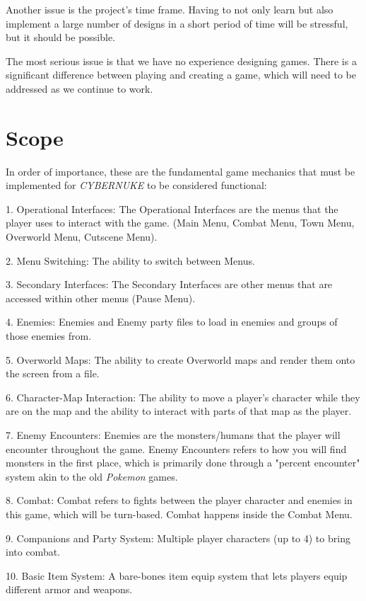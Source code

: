 \documentclass[10pt,conference,onecolumn,compsoc]{IEEEtran}
\begin{document}
Another issue is the project's time frame. Having to not only learn but also implement a large number of designs in a short period of time will be stressful, but it should be possible.

The most serious issue is that we have no experience designing games. There is a significant difference between playing and creating a game, which will need to be addressed as we continue to work. 

\pagebreak
\section{Scope}
In order of importance, these are the fundamental game mechanics that must be implemented for \emph{CYBERNUKE} to be considered functional:
\begin{flushleft}
1. Operational Interfaces:
The Operational Interfaces are the menus that the player uses to interact with the game. (Main Menu, Combat Menu, Town Menu, Overworld Menu, Cutscene Menu).

2. Menu Switching: The ability to switch between Menus.

3. Secondary Interfaces: The Secondary Interfaces are other menus that are accessed within other menus (Pause Menu).

4. Enemies: Enemies and Enemy party files to load in enemies and groups of those enemies from.

5. Overworld Maps: The ability to create Overworld maps and render them onto the screen from a file.

6. Character-Map Interaction: The ability to move a player's character while they are on the map and the ability to interact with parts of that map as the player.

7. Enemy Encounters: Enemies are the monsters/humans that the player will encounter throughout the game. Enemy Encounters refers to how you will find monsters in the first place, which is primarily done through a "percent encounter" system akin to the old \textit{Pokemon} games.

8. Combat: Combat refers to fights between the player character and enemies in this game, which will be turn-based. Combat happens inside the Combat Menu.

9. Companions and Party System: Multiple player characters (up to 4) to bring into combat.

10. Basic Item System: A bare-bones item equip system that lets players equip different armor and weapons.
\end{flushleft}
\end{document}
